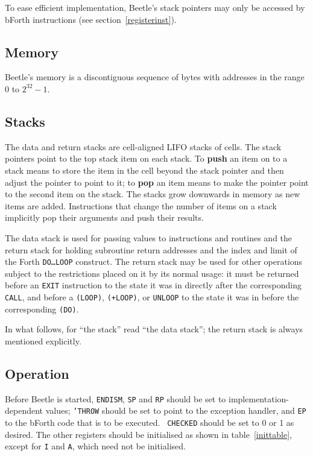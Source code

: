 \documentclass[english]{article}
\begin{document}
To ease efficient implementation, Beetle's stack pointers may only be accessed
by bForth instructions (see section~\ref{registerinst}).


\subsection{Memory}

Beetle's memory is a discontiguous sequence of bytes with addresses in the range $0$ to $2^{32}-1$.


\subsection{Stacks}

The data and return stacks are cell-aligned LIFO stacks of cells. The stack
pointers point to the top stack item on each stack. To {\bf push} an item on to
a stack means to store the item in the cell beyond the stack pointer and then
adjust the pointer to point to it; to {\bf pop} an item means to make the
pointer point to the second item on the stack. The stacks grow downwards in
memory as new items are added. Instructions that change the number of items on a
stack implicitly pop their arguments and push their results.

The data stack is used for passing values to instructions and routines and the
return stack for holding subroutine return addresses and the index and limit of
the Forth {\tt DO\dots LOOP} construct. The return stack may be used for other
operations subject to the restrictions placed on it by its normal usage: it must
be returned before an {\tt EXIT} instruction to the state it was in directly
after the corresponding {\tt CALL}, and before a {\tt (LOOP)}, {\tt (+LOOP)}, or
{\tt UNLOOP} to the state it was in before the corresponding {\tt (DO)}.

In what follows, for ``the stack'' read ``the data stack''; the return stack is
always mentioned explicitly.


\subsection{Operation}
\label{operation}

Before Beetle is started, {\tt ENDISM}, {\tt SP} and {\tt RP} should be set
to implementation-dependent values; {\tt 'THROW} should be set to point to the
exception handler, and {\tt EP} to the bForth code that is to be executed. {\tt
CHECKED} should be set to 0 or 1 as desired. The other registers should be
initialised as shown in table~\ref{inittable}, except for {\tt I} and {\tt A},
which need not be initialised.
\end{document}
